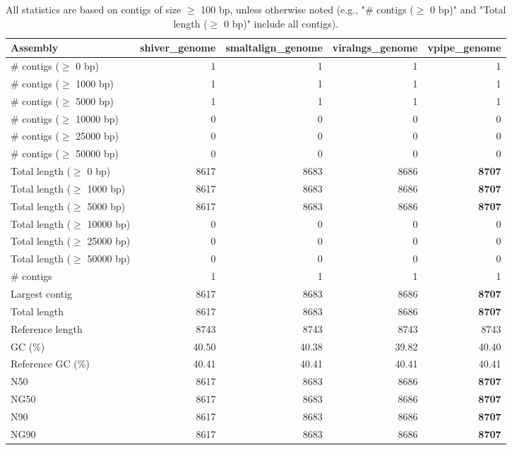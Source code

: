 \documentclass[12pt,a4paper]{article}
\begin{document}
\begin{table}[ht]
\begin{center}
\caption{All statistics are based on contigs of size $\geq$ 100 bp, unless otherwise noted (e.g., "\# contigs ($\geq$ 0 bp)" and "Total length ($\geq$ 0 bp)" include all contigs).}
\begin{tabular}{|l*{4}{|r}|}
\hline
Assembly & shiver\_genome & smaltalign\_genome & viralngs\_genome & vpipe\_genome \\ \hline
\# contigs ($\geq$ 0 bp) & 1 & 1 & 1 & 1 \\ \hline
\# contigs ($\geq$ 1000 bp) & 1 & 1 & 1 & 1 \\ \hline
\# contigs ($\geq$ 5000 bp) & 1 & 1 & 1 & 1 \\ \hline
\# contigs ($\geq$ 10000 bp) & 0 & 0 & 0 & 0 \\ \hline
\# contigs ($\geq$ 25000 bp) & 0 & 0 & 0 & 0 \\ \hline
\# contigs ($\geq$ 50000 bp) & 0 & 0 & 0 & 0 \\ \hline
Total length ($\geq$ 0 bp) & 8617 & 8683 & 8686 & {\bf 8707} \\ \hline
Total length ($\geq$ 1000 bp) & 8617 & 8683 & 8686 & {\bf 8707} \\ \hline
Total length ($\geq$ 5000 bp) & 8617 & 8683 & 8686 & {\bf 8707} \\ \hline
Total length ($\geq$ 10000 bp) & 0 & 0 & 0 & 0 \\ \hline
Total length ($\geq$ 25000 bp) & 0 & 0 & 0 & 0 \\ \hline
Total length ($\geq$ 50000 bp) & 0 & 0 & 0 & 0 \\ \hline
\# contigs & 1 & 1 & 1 & 1 \\ \hline
Largest contig & 8617 & 8683 & 8686 & {\bf 8707} \\ \hline
Total length & 8617 & 8683 & 8686 & {\bf 8707} \\ \hline
Reference length & 8743 & 8743 & 8743 & 8743 \\ \hline
GC (\%) & 40.50 & 40.38 & 39.82 & 40.40 \\ \hline
Reference GC (\%) & 40.41 & 40.41 & 40.41 & 40.41 \\ \hline
N50 & 8617 & 8683 & 8686 & {\bf 8707} \\ \hline
NG50 & 8617 & 8683 & 8686 & {\bf 8707} \\ \hline
N90 & 8617 & 8683 & 8686 & {\bf 8707} \\ \hline
NG90 & 8617 & 8683 & 8686 & {\bf 8707} \\ \hline

\end{tabular}
\end{center}
\end{table}
\end{document}
